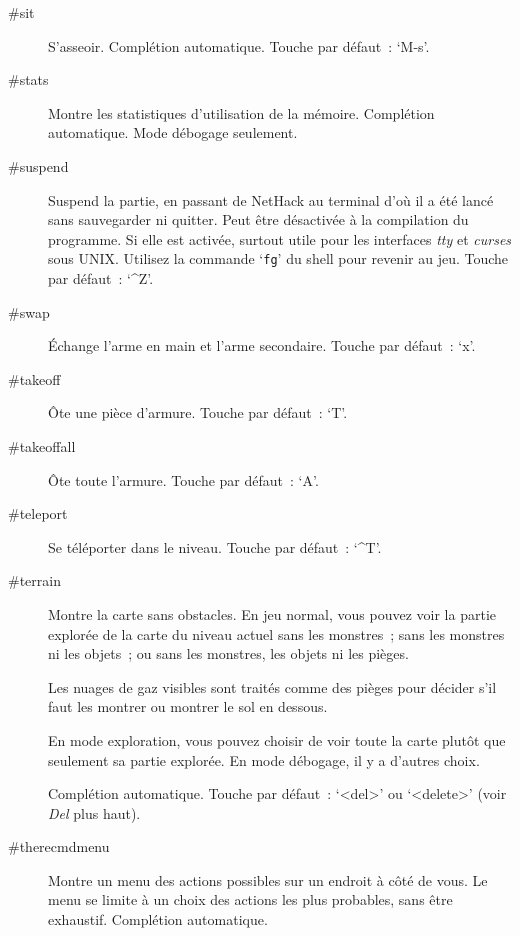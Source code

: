 \documentclass[titlepage]{article}
\begin{document}
\begin{description}
\item[{\#sit}]
S'asseoir.
Complétion automatique.
Touche par défaut~: `M-s'.

\item[{\#stats}]
Montre les statistiques d'utilisation de la mémoire.
Complétion automatique.
Mode débogage seulement.

\item[{\#suspend}]
Suspend la partie, en passant de NetHack au terminal d'où il a été lancé
sans sauvegarder ni quitter.
Peut être désactivée à la compilation du programme.
Si elle est activée, surtout utile pour les interfaces \textit{tty} et
\textit{curses} sous
UNIX.
Utilisez la commande `\texttt{fg}' du shell pour revenir au jeu.
Touche par défaut~: `\textasciicircum{}Z'.

\item[{\#swap}]
Échange l'arme en main et l'arme secondaire.
Touche par défaut~: `x'.

\item[{\#takeoff}]
Ôte une pièce d'armure.
Touche par défaut~: `T'.

\item[{\#takeoffall}]
Ôte toute l'armure.
Touche par défaut~: `A'.

\item[{\#teleport}]
Se téléporter dans le niveau.
Touche par défaut~: `\textasciicircum{}T'.

\item[{\#terrain}]
Montre la carte sans obstacles.
En jeu normal, vous pouvez voir la partie explorée de la carte du niveau
actuel sans les monstres~; sans les monstres ni les objets~; ou sans les
monstres, les objets ni les pièges.


Les nuages de gaz visibles sont traités comme des pièges pour décider s'il
faut les montrer ou montrer le sol en dessous.


En mode exploration, vous pouvez choisir de voir toute la carte plutôt que
seulement sa partie explorée.
En mode débogage, il y a d'autres choix.


Complétion automatique.
Touche par défaut~: `\textless{}del\textgreater{}' ou `\textless{}delete\textgreater{}' (voir \textit{Del} plus
haut).

\item[{\#therecmdmenu}]
Montre un menu des actions possibles sur un endroit à côté de vous.
Le menu se limite à un choix des actions les plus probables, sans être
exhaustif.
Complétion automatique.


\end{description}
\end{document}
